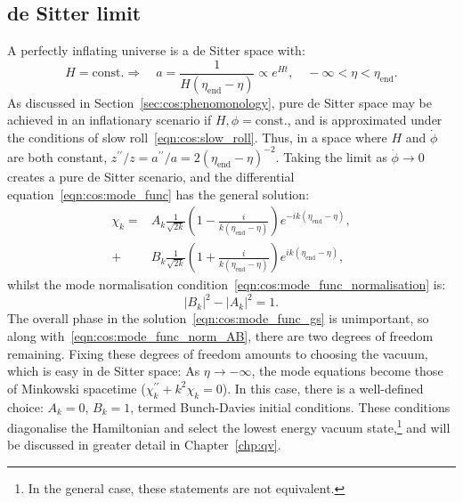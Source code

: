 \subsection{de Sitter limit}
A perfectly inflating universe is a de Sitter space with:
\begin{equation}
  H=\text{const.}\Rightarrow \quad a = \frac{1}{H(\eta_\mathrm{end}-\eta)} \propto e^{Ht}, \quad -\infty<\eta<\eta_\mathrm{end}.
  \label{eqn:cos:de_sitter}
\end{equation}
As discussed in Section~\ref{sec:cos:phenomonology}, pure de Sitter space may be achieved in an inflationary scenario if \(H,\phi=\mathrm{const.}\), and is approximated under the conditions of slow roll~\eqref{eqn:cos:slow_roll}. 
Thus, in a space where \(H\) and \(\dot\phi\) are both constant, \({z^{\prime\prime}/z = a^{\prime\prime}/a = 2{(\eta_\mathrm{end}-\eta)}^{-2}}\). Taking the limit as \(\dot{\phi}\to0\) creates a pure de Sitter scenario, and the differential equation~\eqref{eqn:cos:mode_func} has the general solution:
\begin{align}
  \chi_k = &A_k \frac{1}{\sqrt{2k}}\left( 1-\frac{i}{k(\eta_\mathrm{end}-\eta)} \right)e^{-ik(\eta_\mathrm{end}-\eta)} \nonumber,\\
  + &B_k \frac{1}{\sqrt{2k}}\left( 1+\frac{i}{k(\eta_\mathrm{end}-\eta)} \right)e^{ik(\eta_\mathrm{end}-\eta)},
  \label{eqn:cos:mode_func_gs}
\end{align}
whilst the mode normalisation condition~\eqref{eqn:cos:mode_func_normalisation} is:
\begin{equation}
  |B_k|^2 - |A_k|^2 = 1.
  \label{eqn:cos:mode_func_norm_AB}
\end{equation}
The overall phase in the solution~\eqref{eqn:cos:mode_func_gs} is unimportant, so along with~\eqref{eqn:cos:mode_func_norm_AB}, there are two degrees of freedom remaining. Fixing these degrees of freedom amounts to choosing the vacuum, which is easy in de Sitter space: As \(\eta\rightarrow -\infty\), the mode equations become those of Minkowski spacetime (\(\chi_k^{\prime\prime} +k^2 \chi_k=0\)). In this case, there is a well-defined choice: \(A_k=0\), \(B_k=1\), termed Bunch-Davies initial conditions. These conditions diagonalise the Hamiltonian and select the lowest energy vacuum state,\footnote{In the general case, these statements are not equivalent.} and will be discussed in greater detail in Chapter~\ref{chp:qv}.

